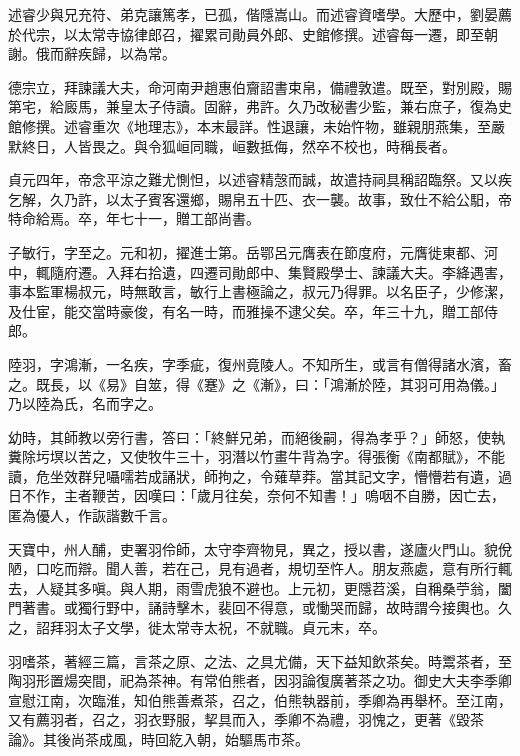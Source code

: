 \begin{pinyinscope}
 述睿少與兄充符、弟克讓篤孝，已孤，偕隱嵩山。而述睿資嗜學。大歷中，劉晏薦於代宗，以太常寺協律郎召，擢累司勛員外郎、史館修撰。述睿每一遷，即至朝謝。俄而辭疾歸，以為常。



 德宗立，拜諫議大夫，命河南尹趙惠伯齎詔書束帛，備禮敦遣。既至，對別殿，賜第宅，給廄馬，兼皇太子侍讀。固辭，弗許。久乃改秘書少監，兼右庶子，復為史館修撰。述睿重次《地理志》，本末最詳。性退讓，未始忤物，雖親朋燕集，至嚴默終日，人皆畏之。與令狐峘同職，峘數抵侮，然卒不校也，時稱長者。



 貞元四年，帝念平涼之難尤惻怛，以述睿精愨而誠，故遣持祠具稱詔臨祭。又以疾乞解，久乃許，以太子賓客還鄉，賜帛五十匹、衣一襲。故事，致仕不給公馹，帝特命給焉。卒，年七十一，贈工部尚書。



 子敏行，字至之。元和初，擢進士第。岳鄂呂元膺表在節度府，元膺徙東都、河中，輒隨府遷。入拜右拾遺，四遷司勛郎中、集賢殿學士、諫議大夫。李絳遇害，事本監軍楊叔元，時無敢言，敏行上書極論之，叔元乃得罪。以名臣子，少修潔，及仕宦，能交當時豪俊，有名一時，而雅操不逮父矣。卒，年三十九，贈工部侍郎。



 陸羽，字鴻漸，一名疾，字季疵，復州竟陵人。不知所生，或言有僧得諸水濱，畜之。既長，以《易》自筮，得《蹇》之《漸》，曰：「鴻漸於陸，其羽可用為儀。」乃以陸為氏，名而字之。



 幼時，其師教以旁行書，答曰：「終鮮兄弟，而絕後嗣，得為孝乎？」師怒，使執糞除圬塓以苦之，又使牧牛三十，羽潛以竹畫牛背為字。得張衡《南都賦》，不能讀，危坐效群兒囁嚅若成誦狀，師拘之，令薙草莽。當其記文字，懵懵若有遺，過日不作，主者鞭苦，因嘆曰：「歲月往矣，奈何不知書！」嗚咽不自勝，因亡去，匿為優人，作詼諧數千言。



 天寶中，州人酺，吏署羽伶師，太守李齊物見，異之，授以書，遂廬火門山。貌侻陋，口吃而辯。聞人善，若在己，見有過者，規切至忤人。朋友燕處，意有所行輒去，人疑其多嗔。與人期，雨雪虎狼不避也。上元初，更隱苕溪，自稱桑苧翁，闔門著書。或獨行野中，誦詩擊木，裴回不得意，或慟哭而歸，故時謂今接輿也。久之，詔拜羽太子文學，徙太常寺太祝，不就職。貞元末，卒。



 羽嗜茶，著經三篇，言茶之原、之法、之具尤備，天下益知飲茶矣。時鬻茶者，至陶羽形置煬突間，祀為茶神。有常伯熊者，因羽論復廣著茶之功。御史大夫李季卿宣慰江南，次臨淮，知伯熊善煮茶，召之，伯熊執器前，季卿為再舉杯。至江南，又有薦羽者，召之，羽衣野服，挈具而入，季卿不為禮，羽愧之，更著《毀茶論》。其後尚茶成風，時回紇入朝，始驅馬市茶。




\end{pinyinscope}
